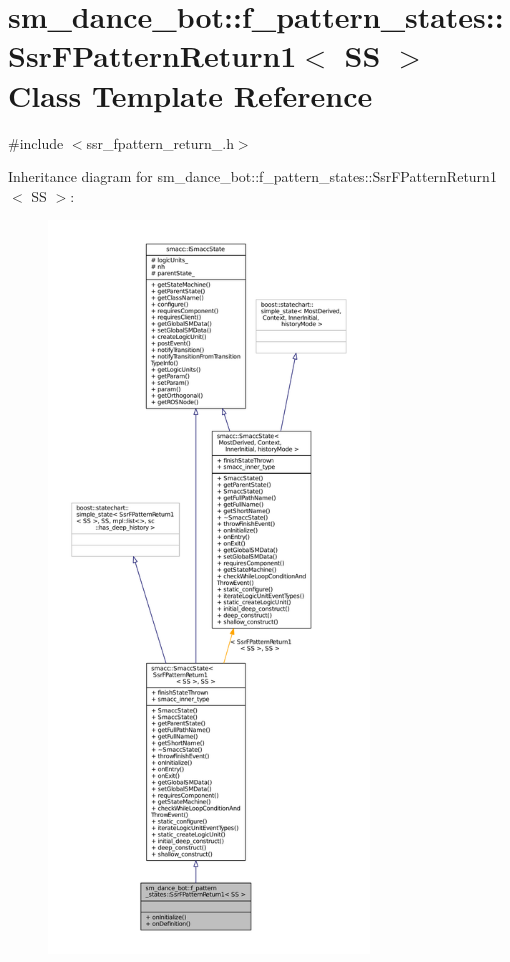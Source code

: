 \hypertarget{structsm__dance__bot_1_1f__pattern__states_1_1SsrFPatternReturn1}{}\section{sm\+\_\+dance\+\_\+bot\+:\+:f\+\_\+pattern\+\_\+states\+:\+:Ssr\+F\+Pattern\+Return1$<$ SS $>$ Class Template Reference}
\label{structsm__dance__bot_1_1f__pattern__states_1_1SsrFPatternReturn1}


{\ttfamily \#include $<$ssr\+\_\+fpattern\+\_\+return\+\_.\+h$>$}



Inheritance diagram for sm\+\_\+dance\+\_\+bot\+:\+:f\+\_\+pattern\+\_\+states\+:\+:Ssr\+F\+Pattern\+Return1$<$ SS $>$\+:
\nopagebreak
\begin{figure}[H]
\begin{center}
\leavevmode
\includegraphics[height=550pt]{structsm__dance__bot_1_1f__pattern__states_1_1SsrFPatternReturn1__inherit__graph}
\end{center}
\end{figure}


